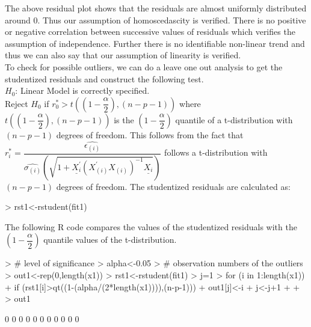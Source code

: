 \documentclass[12pt]{article}
\begin{document}
\begin{itemize}
\begin{figure}[H]
\end{figure}
The above residual plot shows that the residuals are almost uniformly distributed around 0. Thus our assumption of homoscedascity is verified. There is no positive or negative correlation between successive values of residuals which verifies the assumption of independence. Further there is no identifiable non-linear trend and thus we can also say that our assumption of linearity is verified.\\

To check for possible outliers, we can do a leave one out analysis to get the studentized residuals and construct the following test.\\

$H_0$: Linear Model is correctly specified.\\
Reject $H_0$ if $r_{0}^{*}>t\left((1-\dfrac{\alpha}{2}),(n-p-1)\right)$ where $t\left((1-\dfrac{\alpha}{2}),(n-p-1)\right)$ is the $(1-\dfrac{\alpha}{2})$ quantile of a t-distribution with $(n-p-1)$ degrees of freedom. This follows from the fact that $r_{i}^{*}=\dfrac{\widehat{\epsilon_{(i)}}}{\widehat{\sigma_{(i)}}\left(\sqrt{1+\underline{X_{i}^{'}}(X_{(i)}^{'}X_{(i)})^{-1}\underline{X_{i}}}\right)}$ follows a t-distribution with $(n-p-1)$ degrees of freedom. The studentized residuals are calculated as:

\begin{Schunk}
\begin{Sinput}
> rst1<-rstudent(fit1)
\end{Sinput}
\end{Schunk}
The following R code compares the values of the studentized residuals with the $\left(1-\dfrac{\alpha}{2}\right)$ quantile values of the t-distribution.

\begin{Schunk}
\begin{Sinput}
> # level of significance
> alpha<-0.05
> # observation numbers of the outliers
> out1<-rep(0,length(x1))
> rst1<-rstudent(fit1)
> j=1
> for (i in 1:length(x1)){
+   if (rst1[i]>qt((1-(alpha/(2*length(x1)))),(n-p-1))){
+     out1[j]<-i
+     j<-j+1
+   }
+ }
> out1
\end{Sinput}
\begin{Soutput}
 [1] 0 0 0 0 0 0 0 0 0 0 0
\end{Soutput}
\end{Schunk}
\clearpage


\end{itemize}
\end{document}
